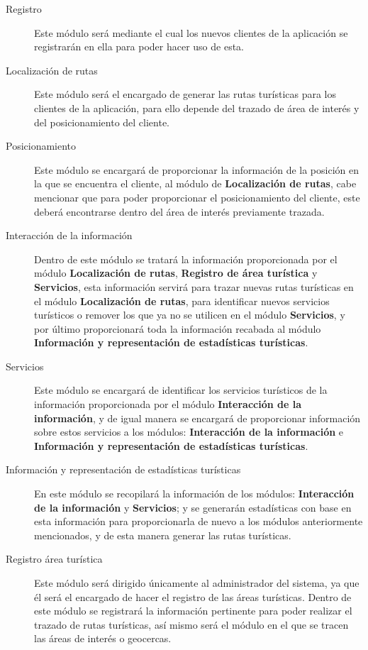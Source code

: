 \begin{description}
	\item[Registro] Este módulo será mediante el cual los nuevos clientes de la aplicación se registrarán en ella para poder hacer uso de esta. 
	
	\item[Localización de rutas] Este módulo será el encargado de generar las rutas turísticas para los clientes de la aplicación, para ello depende del trazado de área de interés y del posicionamiento del cliente.
	
	\item [Posicionamiento] Este módulo se encargará de proporcionar la información de la posición en la que se encuentra el cliente, al módulo de \textbf{Localización de rutas}, cabe mencionar que para poder proporcionar el posicionamiento del cliente, este deberá encontrarse dentro del área de interés previamente trazada.
	
	\item [Interacción de la información] Dentro de este módulo se tratará la información proporcionada por el módulo \textbf{Localización de rutas}, \textbf{Registro de área turística} y \textbf{Servicios}, esta información servirá para trazar nuevas rutas turísticas en el módulo \textbf{Localización de rutas}, para identificar nuevos servicios turísticos o remover los que ya no se utilicen en el módulo \textbf{Servicios}, y por último proporcionará toda la información recabada al módulo \textbf{Información y representación de estadísticas turísticas}.
	
	\item [Servicios] Este módulo se encargará de identificar los servicios turísticos de la información proporcionada por el módulo \textbf{Interacción de la información}, y de igual manera se encargará de proporcionar información sobre estos servicios a los módulos: \textbf{Interacción de la información} e \textbf{Información y representación de estadísticas turísticas}.
	
	\item [Información y representación de estadísticas turísticas] En este módulo se recopilará la información de los módulos: \textbf{Interacción de la información} y \textbf{Servicios}; y se generarán estadísticas con base en esta información para proporcionarla de nuevo a los módulos anteriormente mencionados, y de esta manera generar las rutas turísticas.
	
	\item [Registro área turística] Este módulo será dirigido únicamente al administrador del sistema, ya que él será el encargado de hacer el registro de las áreas turísticas. Dentro de este módulo se registrará la información pertinente para poder realizar el trazado de rutas turísticas, así mismo será el módulo en el que se tracen las áreas de interés o geocercas.
\end{description}


